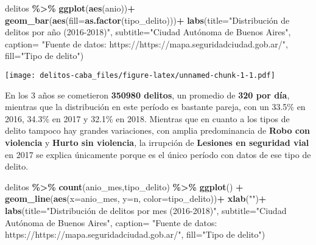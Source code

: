 \documentclass[]{article}
\newenvironment{Shaded}{\begin{snugshade}}{\end{snugshade}}
\newcommand{\DataTypeTok}[1]{\textcolor[rgb]{0.13,0.29,0.53}{#1}}
\newcommand{\KeywordTok}[1]{\textcolor[rgb]{0.13,0.29,0.53}{\textbf{#1}}}
\newcommand{\NormalTok}[1]{#1}
\newcommand{\OperatorTok}[1]{\textcolor[rgb]{0.81,0.36,0.00}{\textbf{#1}}}
\newcommand{\StringTok}[1]{\textcolor[rgb]{0.31,0.60,0.02}{#1}}
\begin{document}
\begin{Shaded}
\begin{Highlighting}[]
\NormalTok{delitos }\OperatorTok{\%>\%}\StringTok{ }
\StringTok{  }\KeywordTok{ggplot}\NormalTok{(}\KeywordTok{aes}\NormalTok{(anio))}\OperatorTok{+}
\StringTok{    }\KeywordTok{geom\_bar}\NormalTok{(}\KeywordTok{aes}\NormalTok{(}\DataTypeTok{fill=}\KeywordTok{as.factor}\NormalTok{(tipo\_delito)))}\OperatorTok{+}
\StringTok{  }\KeywordTok{labs}\NormalTok{(}\DataTypeTok{title=}\StringTok{"Distribución de delitos por año (2016{-}2018)"}\NormalTok{,}
       \DataTypeTok{subtitle=}\StringTok{"Ciudad Autónoma de Buenos Aires"}\NormalTok{,}
       \DataTypeTok{caption=} \StringTok{"Fuente de datos: https://https://mapa.seguridadciudad.gob.ar/"}\NormalTok{,}
       \DataTypeTok{fill=}\StringTok{"Tipo de delito"}\NormalTok{)}
\end{Highlighting}
\end{Shaded}

\texttt{[image: delitos-caba\_files/figure-latex/unnamed-chunk-1-1.pdf]}

En los 3 años se cometieron \textbf{350980 delitos}, un promedio de
\textbf{320 por día}, mientras que la distribución en este período es
bastante pareja, con un 33.5\% en 2016, 34.3\% en 2017 y 32.1\% en 2018.
Mientras que en cuanto a los tipos de delito tampoco hay grandes
variaciones, con amplia predominancia de \textbf{Robo con violencia} y
\textbf{Hurto sin violencia}, la irrupción de \textbf{Lesiones en
seguridad vial} en 2017 se explica únicamente porque es el único período
con datos de ese tipo de delito.

\begin{Shaded}
\begin{Highlighting}[]
\NormalTok{delitos }\OperatorTok{\%>\%}\StringTok{ }
\StringTok{  }\KeywordTok{count}\NormalTok{(anio\_mes,tipo\_delito) }\OperatorTok{\%>\%}\StringTok{ }
\StringTok{  }\KeywordTok{ggplot}\NormalTok{() }\OperatorTok{+}
\StringTok{  }\KeywordTok{geom\_line}\NormalTok{(}\KeywordTok{aes}\NormalTok{(}\DataTypeTok{x=}\NormalTok{anio\_mes, }\DataTypeTok{y=}\NormalTok{n, }\DataTypeTok{color=}\NormalTok{tipo\_delito))}\OperatorTok{+}
\StringTok{  }\KeywordTok{xlab}\NormalTok{(}\StringTok{""}\NormalTok{)}\OperatorTok{+}
\StringTok{  }\KeywordTok{labs}\NormalTok{(}\DataTypeTok{title=}\StringTok{"Distribución de delitos por mes (2016{-}2018)"}\NormalTok{,}
       \DataTypeTok{subtitle=}\StringTok{"Ciudad Autónoma de Buenos Aires"}\NormalTok{,}
       \DataTypeTok{caption=} \StringTok{"Fuente de datos: https://https://mapa.seguridadciudad.gob.ar/"}\NormalTok{,}
       \DataTypeTok{fill=}\StringTok{"Tipo de delito"}\NormalTok{)}
\end{Highlighting}
\end{Shaded}
\end{document}
